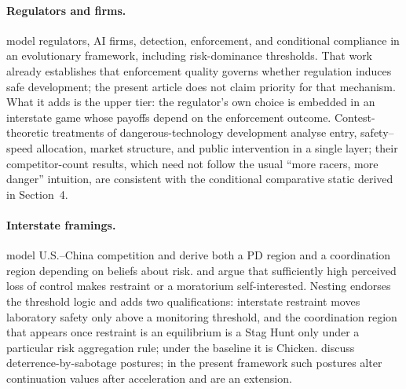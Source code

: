 \documentclass[11pt]{article}
\theoremstyle{plain}
\theoremstyle{definition}
\theoremstyle{remark}
\begin{document}
\paragraph{Regulators and firms.} \citet{bova2023} model regulators, AI firms, detection, enforcement, and conditional compliance in an evolutionary framework, including risk-dominance thresholds. That work already establishes that enforcement quality governs whether regulation induces safe development; the present article does not claim priority for that mechanism. What it adds is the upper tier: the regulator's own choice is embedded in an interstate game whose payoffs depend on the enforcement outcome. Contest-theoretic treatments of dangerous-technology development \citep{naude2020,polborn2025,bdm2026} analyse entry, safety--speed allocation, market structure, and public intervention in a single layer; their competitor-count results, which need not follow the usual ``more racers, more danger'' intuition, are consistent with the conditional comparative static derived in Section~4.

\paragraph{Interstate framings.} \citet{abraham2025} model U.S.--China competition and derive both a PD region and a coordination region depending on beliefs about risk. \citet{katzke2025} and \citet{roussel2026} argue that sufficiently high perceived loss of control makes restraint or a moratorium self-interested. Nesting endorses the threshold logic and adds two qualifications: interstate restraint moves laboratory safety only above a monitoring threshold, and the coordination region that appears once restraint is an equilibrium is a Stag Hunt only under a particular risk aggregation rule; under the baseline it is Chicken. \citet{hendrycks2025} discuss deterrence-by-sabotage postures; in the present framework such postures alter continuation values after acceleration and are an extension.
\end{document}
